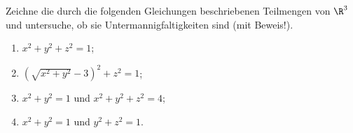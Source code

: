 \begin{prob}
Zeichne die durch die folgenden Gleichungen beschriebenen Teilmengen
von $\R^3$ und untersuche, ob sie Untermannigfaltigkeiten sind (mit Beweis!).
\begin{enumerate}[label=(\alph*)]
\item $x^2+y^2+z^2=1$;
\item $(\sqrt{x^2+y^2}-3)^2+z^2=1$;
\item $x^2+y^2=1$ und $x^2+y^2+z^2=4$;
\item $x^2+y^2=1$ und $y^2+z^2=1$.
\end{enumerate}
\end{prob}

